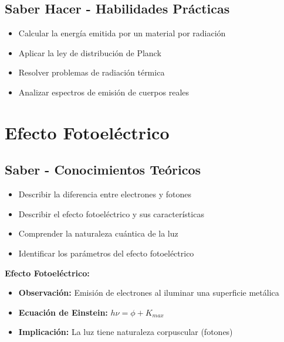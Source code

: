 \documentclass[12pt,a4paper,twoside]{book}
\begin{document}
	\subsection{Saber Hacer - Habilidades Prácticas}
	\begin{hacerbox}
		\begin{itemize}
			\item Calcular la energía emitida por un material por radiación
			\item Aplicar la ley de distribución de Planck
			\item Resolver problemas de radiación térmica
			\item Analizar espectros de emisión de cuerpos reales
		\end{itemize}
	\end{hacerbox}
	
	\section{Efecto Fotoeléctrico}
	\label{sec:efecto_fotoelectrico}
	
	\subsection{Saber - Conocimientos Teóricos}
	\begin{saberbox}
		\begin{itemize}
			\item Describir la diferencia entre electrones y fotones
			\item Describir el efecto fotoeléctrico y sus características
			\item Comprender la naturaleza cuántica de la luz
			\item Identificar los parámetros del efecto fotoeléctrico
		\end{itemize}
	\end{saberbox}
	
	\begin{experimentobox}
		\textbf{Efecto Fotoeléctrico:}
		\begin{itemize}
			\item \textbf{Observación:} Emisión de electrones al iluminar una superficie metálica
			\item \textbf{Ecuación de Einstein:} $h\nu = \phi + K_{max}$
			\item \textbf{Implicación:} La luz tiene naturaleza corpuscular (fotones)
		\end{itemize}
	\end{experimentobox}
	
\end{document}
